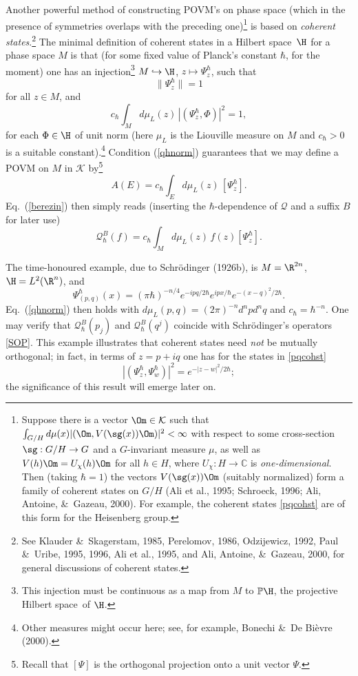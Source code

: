 \documentclass[12pt,titlepage]{article}
\newcommand{\beq}{\begin{equation}}
\newcommand{\eeq}{\end{equation}}
\newcommand{\Hs}{Hilbert space} \newcommand{\Bs}{Banach space}
\newcommand{\raw}{\rightarrow} \newcommand{\rat}{\mapsto}
\newcommand{\hraw}{\hookrightarrow} \newcommand{\Law}{\Leftarrow}
\newcommand{\qh}{q_{\hbar}} \newcommand{\sgh}{\sigma_{\hbar}}
\newcommand{\er}{\eqref}
\newcommand{\ch}{\chi} \newcommand{\ps}{\psi} \newcommand{\Ps}{\Psi}
\newcommand{\CK}{{\mathcal K}}   \newcommand{\CL}{{\mathcal L}}
\newcommand{\CQ}{{\mathcal Q}} \newcommand{\CR}{{\mathcal R}}
\newcommand{\C}{{\mathbb C}} \newcommand{\D}{{\mathbb D}}
\renewcommand{\qh}{\CQ_{\hbar}}
\begin{document}
Another powerful method of constructing POVM's on phase space (which in the presence of symmetries overlaps with the preceding one)\footnote{
Suppose there is a vector $\Om\in\CK$ such that
$\int_{G/H}d\mu(x) |(\Om, V(\sg(x))\Om)|^2 <\infty$
with respect to some cross-section $\sg: G/H\raw G$ and a
$G$-invariant measure $\mu$, as well as $V(h)\Om=U_{\ch}(h)\Om$ for all $h\in H$, where $U_{\ch}:H\raw \C$ is {\it one-dimensional}. Then (taking $\hbar=1$)
the vectors $V(\sg(x))\Om$ (suitably normalized) form a family of coherent states on $G/H$ (Ali et al., 1995; Schroeck, 1996;  Ali,  Antoine,  \&\ Gazeau, 2000). For example, the coherent states \er{pqcohst} are of this form for the Heisenberg group.}
 is based on {\it coherent states}.\footnote{\label{CSFNO}See  Klauder \&\  Skagerstam, 1985, 
Perelomov, 1986,   Odzijewicz, 1992, Paul \&\ Uribe, 1995, 1996, Ali et al., 1995,  and   Ali,  Antoine,  \&\ Gazeau, 2000, for  general discussions of coherent states. } The minimal definition of coherent states in a \Hs\ $\H$ for a phase space $M$ is that 
(for some fixed value of Planck's constant $\hbar$, for the moment)
one has an injection\footnote{This injection must be continuous as a map from $M$ to
$\mathbb{P}\H$, the projective \Hs\ of $\H$.}
 $M\hraw \H$, $z\mapsto\Psi_z^{\hbar}$, such that 
\beq \|\Psi_z^{\hbar}\|=1 \label{normcs}
\eeq
 for all $z\in M$, and 
\beq
 c_{\hbar} \int_M  d\mu_L(z)\,|(\Psi_z^{\hbar},\Phi)|^2 =1, \label{qhnorm}
\eeq
for each $\Phi\in\H$ of unit norm (here $\mu_L$ is the Liouville measure on
$M$ and $c_{\hbar}>0$ is a suitable constant).\footnote{Other measures might occur here; see, for example,   Bonechi \&\  De Bi\`{e}vre (2000).}
Condition (\ref{qhnorm}) guarantees that we may define a POVM on $M$ in $\CK$
by\footnote{Recall that $[\Psi]$ is the orthogonal projection onto a unit vector $\Psi$.}
\beq
A(E)= c_{\hbar} \int_E  d\mu_L(z)\,[\Psi_z^{\hbar}]. \label{pov}
\eeq
Eq.\  (\ref{berezin}) then simply reads (inserting the $\hbar$-dependence of $\CQ$ and a suffix $B$ for later use)
\beq
\qh^B(f)= c_{\hbar}\int_{M}  d\mu_L(z)\, f(z) [\Psi^{\hbar}_z].
\label{b2}
\eeq

The time-honoured example,
due to Schr\"{o}dinger (1926b), is $M=\R^{2n}$, $\H=L^2(\R^n)$, and 
\beq
\Psi_{(p,q)}^{\hbar}(x)=(\pi\hbar)^{-n/4}e^{-
ipq/2\hbar}e^{ipx/\hbar}e^{-(x-q)^2/2\hbar}.\label{pqcohst} 
\eeq
Eq.\ (\ref{qhnorm})  then holds with $d\mu_L(p,q)=(2\pi)^{-n}d^npd^nq$ and
$c_{\hbar}=\hbar^{-n}$. One may verify that $\qh^B(p_j)$ and $\qh^B(q^j)$ coincide with Schr\"{o}dinger's operators \er{SOP}.
This example illustrates that coherent states need {\it not} be mutually orthogonal; in fact, in terms of $z=p+iq$
one has for the states in \er{pqcohst} 
\beq
 |(\Psi^{\hbar}_{z},\Psi^{\hbar}_{w})|^2=e^{-|z-w|^2/2\hbar}; \label{tpbt}
\eeq
the significance of this result will emerge later on.
\end{document}
